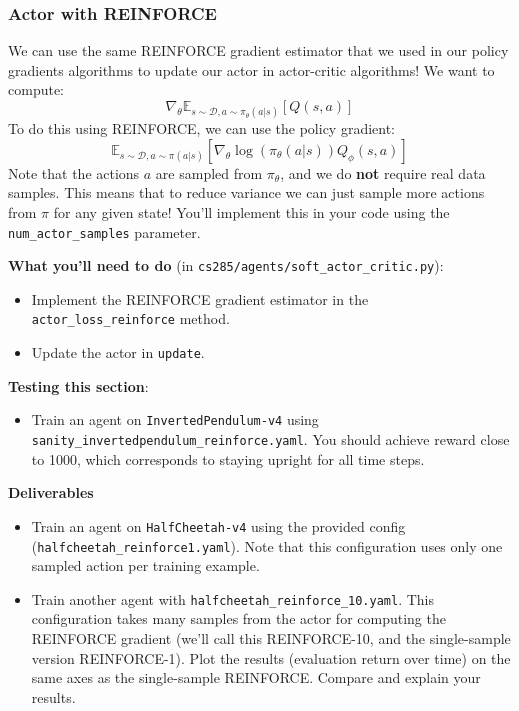 \subsubsection{Actor with REINFORCE}
We can use the same REINFORCE gradient estimator that we used in our policy gradients algorithms to update our actor in actor-critic algorithms! We want to compute:
\[\nabla_\theta\mathbb{E}_{s \sim \mathcal{D}, a \sim \pi_\theta(a|s)}\left[Q(s, a)\right]\]
To do this using REINFORCE, we can use the policy gradient:
\[\mathbb{E}_{s \sim \mathcal{D}, a \sim \pi(a|s)}\left[\nabla_\theta \log(\pi_\theta(a|s))Q_\phi(s, a)\right]\]
Note that the actions $a$ are sampled from $\pi_\theta$, and we do \textbf{not} require real data samples. This means that to reduce variance we can just sample more actions from $\pi$ for any given state! You'll implement this in your code using the \verb|num_actor_samples| parameter.

\textbf{What you'll need to do} (in \verb|cs285/agents/soft_actor_critic.py|):
\begin{itemize}
    \item Implement the REINFORCE gradient estimator in the \verb|actor_loss_reinforce| method.
    \item Update the actor in \verb|update|.
\end{itemize}

\textbf{Testing this section}:
\begin{itemize}
    \item Train an agent on \verb|InvertedPendulum-v4| using \verb|sanity_invertedpendulum_reinforce.yaml|. You should achieve reward close to 1000, which corresponds to staying upright for all time steps.
\end{itemize}

\textbf{Deliverables}
\begin{itemize}
    \item Train an agent on \verb|HalfCheetah-v4| using the provided config (\verb|halfcheetah_reinforce1.yaml|). Note that this configuration uses only one sampled action per training example.
    \item Train another agent with \verb|halfcheetah_reinforce_10.yaml|. This configuration takes many samples from the actor for computing the REINFORCE gradient (we'll call this REINFORCE-10, and the single-sample version REINFORCE-1). Plot the results (evaluation return over time) on the same axes as the single-sample REINFORCE. Compare and explain your results.
\end{itemize}

